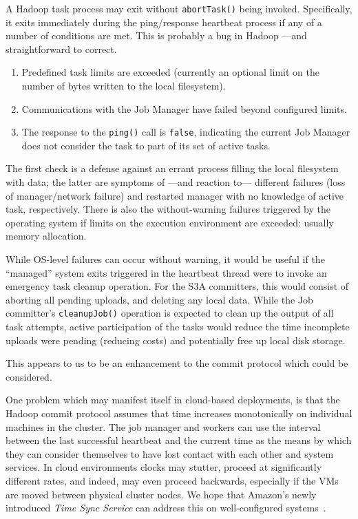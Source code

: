 \documentclass[format=acmsmall, screen=true, nonacm, timestamp, review=false]{acmart}
\begin{document}
A Hadoop task process may exit without \texttt{abortTask()} being invoked.
Specifically, it exits immediately during the ping/response
heartbeat process if any of a number of conditions are met.
This is probably a bug in Hadoop ---and straightforward to correct.

\begin{enumerate}
  \item Predefined task limits are exceeded
  (currently an optional limit on the number of bytes written to the local filesystem).
  \item Communications with the Job Manager have failed beyond configured limits.
  \item The response to the \texttt{ping()} call is \texttt{false}, indicating the current
  Job Manager does not consider the task to part of its set of active tasks.
\end{enumerate}

The first check is a defense against an errant process filling the local
filesystem with data;
the latter are symptoms of ---and reaction to--- different failures (loss of manager/network failure)
and restarted manager with no knowledge of active task, respectively.
There is also the without-warning failures triggered by the operating system
if limits on the execution environment are exceeded: usually memory allocation.

While OS-level failures can occur without warning, it would be useful if the
``managed'' system exits triggered in the heartbeat thread were to invoke
an emergency task cleanup operation.
For the S3A committers, this would consist of aborting all pending uploads, and
deleting any local data.
While the Job committer's \texttt{cleanupJob()} operation is expected to clean up
the output of all task attempts, active participation of the tasks would
reduce the time incomplete uploads were pending (reducing costs) and
potentially free up local disk storage.

This appears to us to be an enhancement to the commit protocol which could
be considered.


One problem which may manifest itself in cloud-based deployments,
is that the Hadoop commit protocol assumes that time increases monotonically
on individual machines in the cluster.
The job manager and workers can use the interval between the last successful heartbeat
and the current time as the means by which they can consider themselves to have lost
contact with each other and system services.
In cloud environments clocks may stutter, proceed at significantly different rates,
and indeed, may even proceed backwards, especially if the VMs are moved between
physical cluster nodes.
We hope that Amazon's newly introduced \emph{Time Sync Service}
can address this on well-configured systems\ \cite{AWS-clock-service}.
\end{document}
